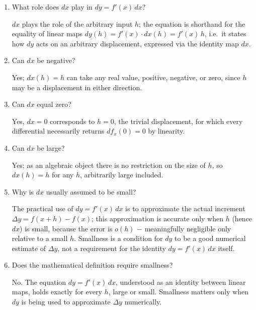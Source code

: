 \documentclass{self-check}
\begin{document}
\begin{enumerate}[resume, leftmargin=*, itemsep=8pt]
\begin{answer}
      \(dx(h)=h\) simply returns whatever displacement \(h\) is supplied, with no constraint tying it to a particular value; any real number (or vector) may be substituted. This is what allows \(dy=f'(x)\,dx\) to be understood as an identity between linear maps, holding for every choice of input.
    \end{answer}
  \item What role does \(dx\) play in \(dy=f'(x)\,dx\)?
    \begin{answer}
      \(dx\) plays the role of the arbitrary input \(h\); the equation is shorthand for the equality of linear maps \(dy(h)=f'(x)\cdot dx(h)=f'(x)\,h\), i.e.\ it states how \(dy\) acts on an arbitrary displacement, expressed via the identity map \(dx\).
    \end{answer}
  \item Can \(dx\) be negative?
    \begin{answer}
      Yes; \(dx(h)=h\) can take any real value, positive, negative, or zero, since \(h\) may be a displacement in either direction.
    \end{answer}
  \item Can \(dx\) equal zero?
    \begin{answer}
      Yes, \(dx=0\) corresponds to \(h=0\), the trivial displacement, for which every differential necessarily returns \(df_{x}(0)=0\) by linearity.
    \end{answer}
  \item Can \(dx\) be large?
    \begin{answer}
      Yes; as an algebraic object there is no restriction on the size of \(h\), so \(dx(h)=h\) for any \(h\), arbitrarily large included.
    \end{answer}
  \item Why is \(dx\) usually assumed to be small?
    \begin{answer}
      The practical use of \(dy=f'(x)\,dx\) is to approximate the actual increment \(\Delta y=f(x+h)-f(x)\); this approximation is accurate only when \(h\) (hence \(dx\)) is small, because the error is \(o(h)\) \(-\) meaningfully negligible only relative to a small \(h\). Smallness is a condition for \(dy\) to be a good numerical estimate of \(\Delta y\), not a requirement for the identity \(dy=f'(x)\,dx\) itself.
    \end{answer}
  \item Does the mathematical definition require smallness?
    \begin{answer}
      No. The equation \(dy=f'(x)\,dx\), understood as an identity between linear maps, holds exactly for every \(h\), large or small. Smallness matters only when \(dy\) is being used to approximate \(\Delta y\) numerically.

\end{answer}
\end{enumerate}
\end{document}
